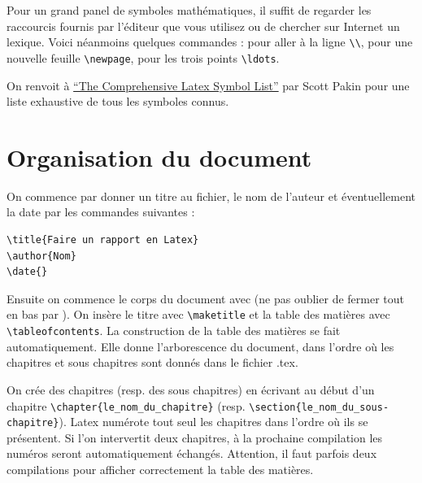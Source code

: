 Pour un grand panel de symboles mathématiques, il suffit de regarder les raccourcis fournis par l'éditeur 
que vous utilisez ou de chercher sur Internet un lexique. Voici néanmoins quelques commandes : 
pour aller à la ligne  \lstinline+\\+, 
pour une nouvelle feuille \lstinline+\newpage+, pour les trois points  \lstinline+\ldots+.

On renvoit à \href{http://www.tex.ac.uk/tex-archive/info/symbols/comprehensive/symbols-a4.pdf}
{``The Comprehensive Latex Symbol List''} par Scott Pakin pour une liste exhaustive de tous les
 symboles connus.


\section{Organisation du document}


On commence par donner un titre au  fichier, le nom de l'auteur et éventuellement la date par les
 commandes suivantes :\medskip

\begin{lstlisting}
\title{Faire un rapport en Latex} 
\author{Nom} 
\date{}
\end{lstlisting}



Ensuite on commence le corps du document avec \lstinline++ 
(ne pas oublier de fermer tout en bas par \lstinline++). 
On insère le titre avec \lstinline+\maketitle+ et la table des matières avec \lstinline+\tableofcontents+.
La construction de la table des matières se fait automatiquement. 
Elle donne l'arborescence du document, dans l'ordre où les chapitres et sous chapitres sont donnés 
dans le fichier .tex.\medskip	


On crée  des chapitres (resp. des sous chapitres) en écrivant au début d'un chapitre 
\lstinline+\chapter{le_nom_du_chapitre}+ 
(resp. \lstinline+\section{le_nom_du_sous-chapitre}+).  
Latex numérote tout seul les chapitres dans l'ordre où ils se présentent. 
Si l'on intervertit deux chapitres, à la prochaine compilation les numéros seront automatiquement 
échangés. Attention, il faut parfois deux compilations pour afficher correctement la table des matières.  \medskip
 
